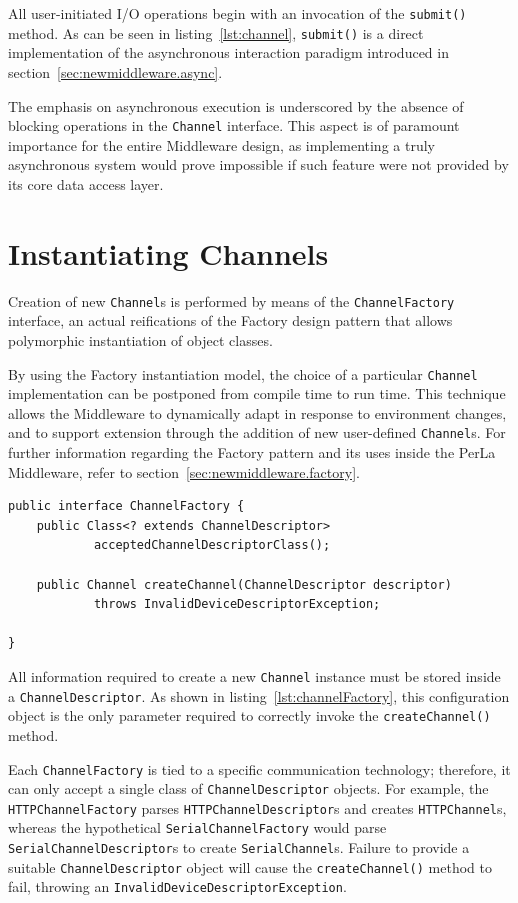 All user-initiated I/O operations begin with an invocation of the \texttt{submit()} method. As can be seen in listing~\ref{lst:channel}, \texttt{submit()} is a direct implementation of the asynchronous interaction paradigm introduced in section~\ref{sec:newmiddleware.async}.

The emphasis on asynchronous execution is underscored by the absence of blocking operations in the \texttt{Channel} interface. This aspect is of paramount importance for the entire Middleware design, as implementing a truly asynchronous system would prove impossible if such feature were not provided by its core data access layer.


\section{Instantiating Channels}

Creation of new \texttt{Channel}s is performed by means of the  \texttt{ChannelFactory} interface, an actual reifications of the Factory design pattern that allows polymorphic instantiation of object classes.

By using the Factory instantiation model, the choice of a particular \texttt{Channel} implementation can be postponed from compile time to run time. This technique allows the Middleware to dynamically adapt in response to environment changes, and to support extension through the addition of new user-defined \texttt{Channel}s. For further information regarding the Factory pattern and its uses inside the PerLa Middleware, refer to section~\ref{sec:newmiddleware.factory}.

\lstset{language=Java}
\begin{lstlisting}[float,floatplacement=H,caption=The ChannelFactory interface,label={lst:channelFactory}]
public interface ChannelFactory {
	public Class<? extends ChannelDescriptor>
			acceptedChannelDescriptorClass();

	public Channel createChannel(ChannelDescriptor descriptor)
			throws InvalidDeviceDescriptorException;

}
\end{lstlisting}

All information required to create a new \texttt{Channel} instance must be stored inside a \texttt{ChannelDescriptor}. As shown in listing~\ref{lst:channelFactory}, this configuration object is the only parameter required to correctly invoke the \texttt{createChannel()} method.

Each \texttt{ChannelFactory} is tied to a specific communication technology; therefore, it can only accept a single class of \texttt{ChannelDescriptor} objects. For example, the \texttt{HTTPChannelFactory} parses \texttt{HTTPChannelDescriptor}s and creates \texttt{HTTPChannel}s, whereas the hypothetical \texttt{SerialChannelFactory} would parse \texttt{SerialChannelDescriptor}s to create \texttt{SerialChannel}s. Failure to provide a suitable \texttt{ChannelDescriptor} object will cause the \texttt{createChannel()} method to fail, throwing an \texttt{InvalidDeviceDescriptorException}.


